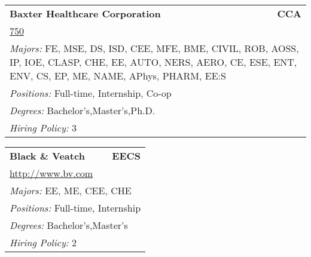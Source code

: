 \documentclass[twoside]{article}
\begin{document}
\begin{center}
\begin{multicols}{3}
\begin{FlushLeft}
\begin{minipage}{\columnwidth}
\end{minipage}
 
\begin{minipage}{\columnwidth}\begin{tabularx}{.95\columnwidth}{Xr}
                 {\Large\bf Baxter Healthcare Corporation} & {\Large\bf CCA}\\
    \multicolumn{2}{p{.95\columnwidth}}{\url{750}}\\
    \multicolumn{2}{p{.95\columnwidth}}{\emph{Majors:} FE, MSE, DS, ISD, CEE, MFE, BME, CIVIL, ROB, AOSS, IP, IOE, CLASP, CHE, EE, AUTO, NERS, AERO, CE, ESE, ENT, ENV, CS, EP, ME, NAME, APhys, PHARM, EE:S}\\
    \multicolumn{2}{p{.95\columnwidth}}{\emph{Positions:} Full-time, Internship, Co-op}\\
    \multicolumn{2}{p{.95\columnwidth}}{\emph{Degrees:} Bachelor's,Master's,Ph.D.}\\
    \multicolumn{2}{p{.95\columnwidth}}{\emph{Hiring Policy:} 3}\\
    \end{tabularx}
    
\end{minipage}
 
\begin{minipage}{\columnwidth}\begin{tabularx}{.95\columnwidth}{Xr}
                 {\Large\bf Black \& Veatch} & {\Large\bf EECS}\\
    \multicolumn{2}{p{.95\columnwidth}}{\url{http://www.bv.com}}\\
    \multicolumn{2}{p{.95\columnwidth}}{\emph{Majors:} EE, ME, CEE, CHE}\\
    \multicolumn{2}{p{.95\columnwidth}}{\emph{Positions:} Full-time, Internship}\\
    \multicolumn{2}{p{.95\columnwidth}}{\emph{Degrees:} Bachelor's,Master's}\\
    \multicolumn{2}{p{.95\columnwidth}}{\emph{Hiring Policy:} 2}\\
    \end{tabularx}
    
\end{minipage}
 

\end{FlushLeft}
\end{multicols}
\end{center}
\end{document}
